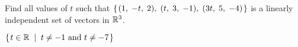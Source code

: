 
\begin{Exercise}[
name={},
title={}, 
difficulty=0,
origin={\cite{BS}}]
Find all values of $t$ such that $\mbox{$\left\{\hspace{0.1em}(1,\; -t,\; 2),\; (t,\; 3,\; -1),\; (3t,\; 5,\; -4)\hspace{0.1em}\right\}$}$ is a linearly independent set of vectors in $\mathbb{R}^3$.
\end{Exercise}
\begin{Answer}
$\mbox{$\left\{\hspace{0.1em}t\in\mathbb{R}\;\;\middle|\;\; t\neq-1\text{ and }t\neq-7\hspace{0.1em}\right\}$}$
\end{Answer}
